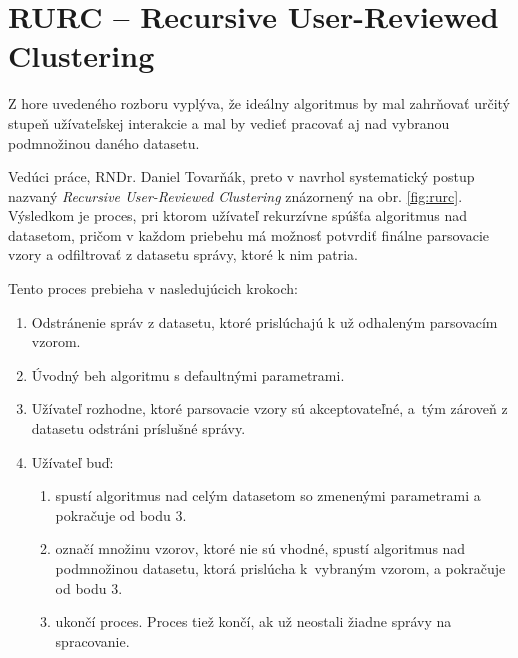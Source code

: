 \section{RURC -- Recursive User-Reviewed Clustering}
\label{sec:rurc}
Z hore uvedeného rozboru vyplýva, že ideálny algoritmus by mal zahrňovať určitý stupeň užívateľskej interakcie a mal by vedieť pracovať aj nad vybranou podmnožinou daného datasetu.
\par Vedúci práce, RNDr. Daniel Tovarňák, preto v \parencite{Tovarnak2017} navrhol syste\-matický postup nazvaný \emph{Recursive User-Reviewed Clustering} znázornený na obr. \ref{fig:rurc}. Výsledkom je proces, pri ktorom užívateľ rekurzívne spúšťa algoritmus nad datasetom, pričom v každom priebehu má možnosť potvrdiť finálne parsovacie vzory a odfiltrovať z datasetu správy, ktoré k nim patria.
\par Tento proces prebieha v nasledujúcich krokoch:

\begin{enumerate}
  \item Odstránenie správ z datasetu, ktoré prislúchajú k už odhaleným parsovacím vzorom.
  \item Úvodný beh algoritmu s defaultnými parametrami.
  \item Užívateľ rozhodne, ktoré parsovacie vzory sú akceptovateľné, a~tým zároveň z datasetu odstráni príslušné správy.
  \item Užívateľ buď:
  	\begin{enumerate}
   		 \item spustí algoritmus nad celým datasetom so zmenenými parametrami a pokračuje od bodu 3.
   		 \item označí množinu vzorov, ktoré nie sú vhodné, spustí algoritmus nad podmnožinou datasetu, ktorá prislúcha k~vyb\-raným vzorom, a 				pokračuje od bodu 3.
   		 \item ukončí proces. Proces tiež končí, ak už neostali žiadne správy na spracovanie.
 	 \end{enumerate}
\end{enumerate}

